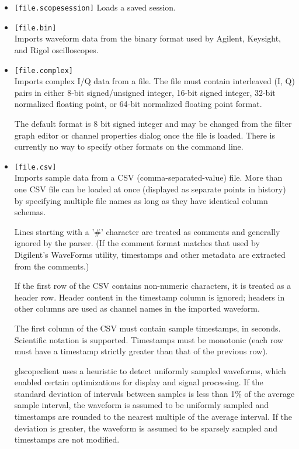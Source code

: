 \begin{itemize}
\item \texttt{[file.scopesession]}
Loads a saved session.

\item \texttt{[file.bin]} \\
Imports waveform data from the binary format used by Agilent, Keysight, and Rigol oscilloscopes.

\item \texttt{[file.complex]} \\
Imports complex I/Q data from a file. The file must contain interleaved (I, Q) pairs in either 8-bit signed/unsigned
integer, 16-bit signed integer, 32-bit normalized floating point, or 64-bit normalized floating point format.

The default format is 8 bit signed integer and may be changed from the filter graph editor or channel properties dialog
once the file is loaded. There is currently no way to specify other formats on the command line.

\item \texttt{[file.csv]} \\
Imports sample data from a CSV (comma-separated-value) file. More than one CSV file can be loaded at once (displayed as
separate points in history) by specifying multiple file names as long as they have identical column schemas.

Lines starting with a '\#' character are treated as comments and generally ignored by the parser. (If the comment format
matches that used by Digilent's WaveForms utility, timestamps and other metadata are extracted from the comments.)

If the first row of the CSV contains non-numeric characters, it is treated as a header row. Header content in the
timestamp column is ignored; headers in other columns are used as channel names in the imported waveform.

The first column of the CSV must contain sample timestamps, in seconds. Scientific notation is supported. Timestamps
must be monotonic (each row must have a timestamp strictly greater than that of the previous row).

glscopeclient uses a heuristic to detect uniformly sampled waveforms, which enabled certain optimizations for display
and signal processing. If the standard deviation of intervals between samples is less than 1\% of the average sample
interval, the waveform is assumed to be uniformly sampled and timestamps are rounded to the nearest multiple of the
average interval. If the deviation is greater, the waveform is assumed to be sparsely sampled and timestamps are not
modified.


\end{itemize}
